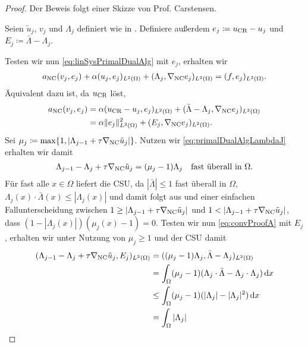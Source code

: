 \begin{proof}
  Der Beweis folgt einer Skizze von Prof. Carstensen.
  
  Seien $\tilde{u}_j$, $v_j$ und $\Lambda_j$ definiert wie in
  .
  Definiere außerdem $e_j \coloneqq u_\textup{CR}-u_j$ und $E_j\coloneqq
  \bar\Lambda-\Lambda_j$. 

  Testen wir nun \eqref{eq:linSysPrimalDualAlg} mit $e_j$, erhalten wir
  \begin{align*}
    a_\textup{NC}(v_j,e_j) + \alpha(u_j,e_j)_{L^2(\Omega)} 
    + (\Lambda_j,\nabla_\textup{NC} e_j)_{L^2(\Omega)}
    = 
    (f,e_j)_{L^2(\Omega)}.
  \end{align*}
  Äquivalent dazu ist, da $u_\textup{CR}$  löst, 
  \begin{align}
    \label{eq:convProofE}
    a_\textup{NC}(v_j,e_j) &= 
    \alpha(u_\textup{CR}-u_j,e_j)_{L^2(\Omega)} 
    + (\bar\Lambda-\Lambda_j,\nabla_\textup{NC} e_j)_{L^2(\Omega)} \notag\\
    &= 
    \alpha\Vert e_j\Vert_{L^2(\Omega)}^2
    + (E_j,\nabla_\textup{NC} e_j)_{L^2(\Omega)}.
  \end{align}
  Sei $\mu_j\coloneqq \max\{1,|\Lambda_{j-1}+\tau
  \nabla_\textup{NC} \tilde{u}_j|\}$.
  Nutzen wir \eqref{eq:primalDualAlgLambdaJ} erhalten wir damit
  \begin{align}
    \label{eq:convProofA}
    \Lambda_{j-1}-\Lambda_j+\tau \nabla_\textup{NC} \tilde{u}_j 
    = (\mu_j-1)\Lambda_j \quad\text{fast überall in }\Omega.
  \end{align}
  Für fast alle $x\in\Omega$ liefert die CSU, da $|\bar\Lambda|\leq 1$ fast
  überall in $\Omega$,
  $\Lambda_j(x)\cdot\bar\Lambda(x)\leq|\Lambda_j(x)|$ und damit folgt 
  aus  und einer einfachen Fallunterscheidung
  zwischen $1\geq |\Lambda_{j-1}+\tau\nabla_\textup{NC} \tilde{u}_j|$ und
  $1< |\Lambda_{j-1}+\tau\nabla_\textup{NC} \tilde{u}_j|$,
  dass $(1-|\Lambda_j(x)|)(\mu_j(x)-1)=0$.
  Testen wir nun \eqref{eq:convProofA} mit $E_j$, erhalten wir 
  unter Nutzung von $\mu_j\geq 1$ und der CSU damit
  \begin{align*}
    ( \Lambda_{j-1}-\Lambda_j+\tau\gradnc \tilde{u}_j,
    E_j)_{L^2(\Omega)}
    &= 
    ( (\mu_j-1)\Lambda_j,\bar\Lambda-\Lambda_j)_{L^2(\Omega)}\\
    &=
    \int_\Omega
    (\mu_j-1)(\Lambda_j\cdot\bar\Lambda-\Lambda_j\cdot\Lambda_j)\,\mathrm dx\\
    &\leq
    \int_\Omega (\mu_j-1)(|\Lambda_j|-|\Lambda_j|^2)\,\mathrm dx\\
    &=
    \int_\Omega |\Lambda_j|

\end{align*}
\end{proof}
